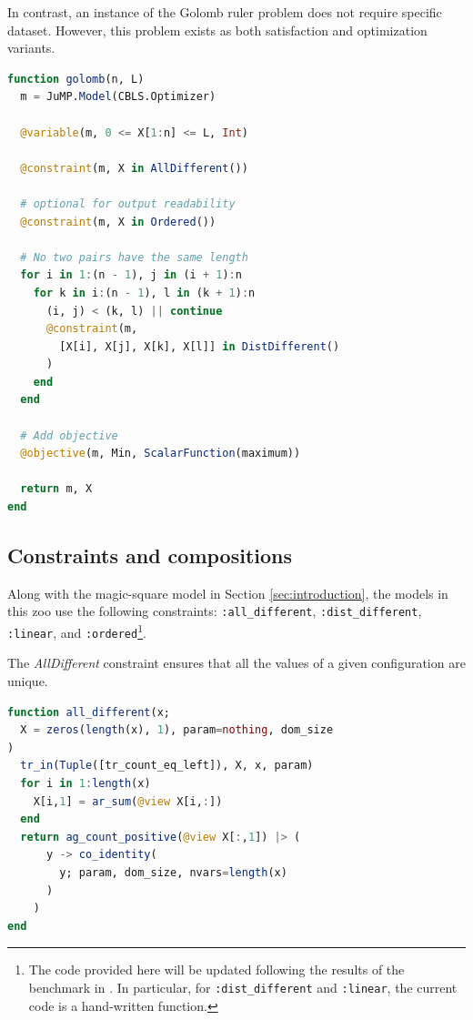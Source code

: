 \documentclass{juliacon}
\begin{document}
In contrast, an instance of the Golomb ruler problem does not require specific dataset. However, this problem exists as both satisfaction and optimization variants.

\begin{lstlisting}[language = Julia]
function golomb(n, L)
  m = JuMP.Model(CBLS.Optimizer)

  @variable(m, 0 <= X[1:n] <= L, Int)

  @constraint(m, X in AllDifferent())

  # optional for output readability
  @constraint(m, X in Ordered())

  # No two pairs have the same length
  for i in 1:(n - 1), j in (i + 1):n
    for k in i:(n - 1), l in (k + 1):n
      (i, j) < (k, l) || continue
      @constraint(m,
        [X[i], X[j], X[k], X[l]] in DistDifferent()
      )
    end
  end

  # Add objective
  @objective(m, Min, ScalarFunction(maximum))

  return m, X
end
\end{lstlisting}

\subsection{Constraints and compositions}
\label{subsec:constraints}

Along with the magic-square model in Section \ref{sec:introduction}, the models in this zoo use the following constraints: \texttt{:all\_different}, \texttt{:dist\_different}, \texttt{:linear}, and \texttt{:ordered}\footnote{The code provided here will be updated following the results of the benchmark in \cite{baffier2022interpretable}. In particular, for \texttt{:dist\_different} and \texttt{:linear}, the current code is a hand-written function.}.\newline

The \emph{AllDifferent} constraint ensures that all the values of a given configuration are unique.

\begin{lstlisting}[language = Julia]
function all_different(x;
  X = zeros(length(x), 1), param=nothing, dom_size
)
  tr_in(Tuple([tr_count_eq_left]), X, x, param)
  for i in 1:length(x)
    X[i,1] = ar_sum(@view X[i,:])
  end
  return ag_count_positive(@view X[:,1]) |> (
      y -> co_identity(
        y; param, dom_size, nvars=length(x)
      )
    )
end
\end{lstlisting}
\end{document}
